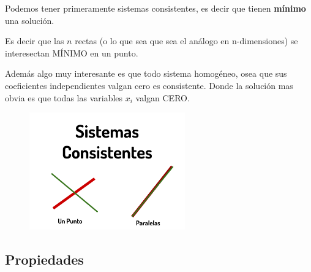 \documentclass[12pt, fleqn]{report}                             %
\theoremstyle{break}                                            %
\begin{document}
            Podemos tener primeramente sistemas consistentes, es decir que tienen \textbf{mínimo}
            una solución.

            Es decir que las $n$ rectas (o lo que sea que sea el análogo en n-dimensiones)
            se interesectan MÍNIMO en un punto.

            Además algo muy interesante es que todo sistema homogéneo, osea que sus coeficientes
            independientes valgan cero es consistente. Donde la solución mas obvia es que
            todas las variables $x_i$ valgan CERO.

            \begin{figure}[h]
                \centering
                \includegraphics[width=0.60\textwidth]{SistemasConsistentes}
            \end{figure}


            \vspace{1em}
            \subsection{Propiedades}
\end{document}
